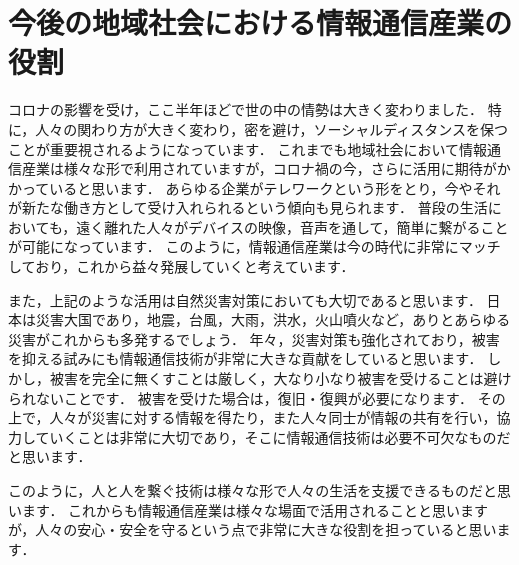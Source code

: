 \section*{今後の地域社会における情報通信産業の役割}
コロナの影響を受け，ここ半年ほどで世の中の情勢は大きく変わりました．
特に，人々の関わり方が大きく変わり，密を避け，ソーシャルディスタンスを保つことが重要視されるようになっています．
これまでも地域社会において情報通信産業は様々な形で利用されていますが，コロナ禍の今，さらに活用に期待がかかっていると思います．
あらゆる企業がテレワークという形をとり，今やそれが新たな働き方として受け入れられるという傾向も見られます．
普段の生活においても，遠く離れた人々がデバイスの映像，音声を通して，簡単に繋がることが可能になっています．
このように，情報通信産業は今の時代に非常にマッチしており，これから益々発展していくと考えています．

また，上記のような活用は自然災害対策においても大切であると思います．
日本は災害大国であり，地震，台風，大雨，洪水，火山噴火など，ありとあらゆる災害がこれからも多発するでしょう．
年々，災害対策も強化されており，被害を抑える試みにも情報通信技術が非常に大きな貢献をしていると思います．
しかし，被害を完全に無くすことは厳しく，大なり小なり被害を受けることは避けられないことです．
被害を受けた場合は，復旧・復興が必要になります．
その上で，人々が災害に対する情報を得たり，また人々同士が情報の共有を行い，協力していくことは非常に大切であり，そこに情報通信技術は必要不可欠なものだと思います．

このように，人と人を繋ぐ技術は様々な形で人々の生活を支援できるものだと思います．
これからも情報通信産業は様々な場面で活用されることと思いますが，人々の安心・安全を守るという点で非常に大きな役割を担っていると思います．
